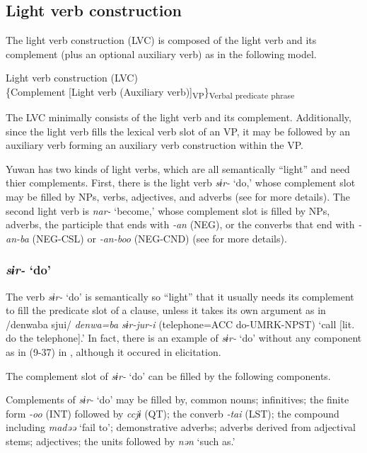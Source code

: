 \subsection{Light verb construction}\label{sec:9.1.2}

The light verb construction (LVC) is composed of the light verb and its complement (plus an optional auxiliary verb) as in the following model.

\ea   Light verb construction (LVC) \label{ex:9.22}\\
  \{Complement \hspace{\tabcolsep} [Light verb \hspace{\tabcolsep} (Auxiliary verb)]\textsubscript{VP}\}\textsubscript{Verbal predicate phrase}
\z

The LVC minimally consists of the light verb and its complement. Additionally, since the light verb fills the lexical verb slot of an VP, it may be followed by an auxiliary verb forming an auxiliary verb construction within the VP.

Yuwan has two kinds of light verbs, which are all semantically “light” and need thier complements. First, there is the light verb \textit{sɨr-} ‘do,’ whose complement slot may be filled by NPs, verbs, adjectives, and adverbs (see  for more details). The second light verb is \textit{nar-} ‘become,’ whose complement slot is filled by NPs, adverbs, the participle that ends with \textit{{}-an} (NEG), or the converbs that end with \textit{{}-an-ba} (NEG-CSL) or \textit{{}-an-boo} (NEG-CND) (see  for more details).

\subsubsection{\textit{sɨr-} ‘do’}\label{sec:9.1.2.1}

The verb \textit{sɨr-} ‘do’ is semantically so “light” that it usually needs its complement to fill the predicate slot of a clause, unless it takes its own argument as in /denwaba sjui/ \textit{denwa=ba} \textit{sɨr-jur-i} (telephone=ACC do-UMRK-NPST) ‘call [lit. do the telephone].’ In fact, there is an example of \textit{sɨr-} ‘do’ without any component as in (9-37) in , although it occured in elicitation.

The complement slot of \textit{sɨr-} ‘do’ can be filled by the following components.

\ea  Complements of \textit{sɨr-} ‘do’ may be filled by, \label{ex:9.23}
  \ea  common nouns;
  \ex  infinitives;
  \ex  the finite form \textit{{}-oo} (INT) followed by \textit{ccjɨ} (QT);
  \ex  the converb \textit{{}-tai} (LST);
  \ex  the compound including \textit{madəə} ‘fail to’;
  \ex  demonstrative adverbs;
  \ex  adverbs derived from adjectival stems;
  \ex  adjectives;
  \ex  the units followed by \textit{nən} ‘such as.’
  \z
\z

